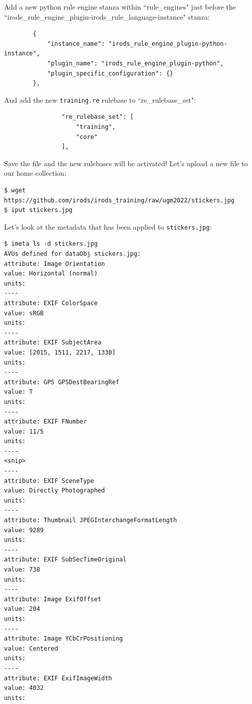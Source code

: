 \documentclass[10pt,oneside]{memoir}
\begin{document}
Add a new python rule engine stanza within ``rule\_engines" just before the ``irods\_rule\_engine\_plugin-irods\_rule\_language-instance" stanza:

\begin{lrbox}{\lstServerConfigA}
\begin{lstlisting}
        {
            "instance_name": "irods_rule_engine_plugin-python-instance",
            "plugin_name": "irods_rule_engine_plugin-python",
            "plugin_specific_configuration": {}
        },
\end{lstlisting}
\end{lrbox}
\href{https://github.com/irods/irods_training/blob/ugm2022/beginner/server_config.json#L41-L45}{\usebox{\lstServerConfigA}}

And add the new \texttt{training.re} rulebase to ``re\_rulebase\_set":

\begin{lrbox}{\lstServerConfigB}
\begin{lstlisting}
                "re_rulebase_set": [
                    "training",
                    "core"
                ],
\end{lstlisting}
\end{lrbox}
\href{https://github.com/irods/irods_training/blob/ugm2022/beginner/server_config.json#L56-L59}{\usebox{\lstServerConfigB}}

Save the file and the new rulebases will be activated!  Let's upload a new file to our home collection:

\begin{lstlisting}
$ wget https://github.com/irods/irods_training/raw/ugm2022/stickers.jpg
$ iput stickers.jpg
\end{lstlisting}

\newpage

Let's look at the metadata that has been applied to \texttt{stickers.jpg}:

\begin{lstlisting}
$ imeta ls -d stickers.jpg
AVUs defined for dataObj stickers.jpg:
attribute: Image Orientation
value: Horizontal (normal)
units:
----
attribute: EXIF ColorSpace
value: sRGB
units:
----
attribute: EXIF SubjectArea
value: [2015, 1511, 2217, 1330]
units:
----
attribute: GPS GPSDestBearingRef
value: T
units:
----
attribute: EXIF FNumber
value: 11/5
units:
----
<snip>
----
attribute: EXIF SceneType
value: Directly Photographed
units:
----
attribute: Thumbnail JPEGInterchangeFormatLength
value: 9289
units:
----
attribute: EXIF SubSecTimeOriginal
value: 738
units:
----
attribute: Image ExifOffset
value: 204
units:
----
attribute: Image YCbCrPositioning
value: Centered
units:
----
attribute: EXIF ExifImageWidth
value: 4032
units:
\end{lstlisting}
\end{document}
